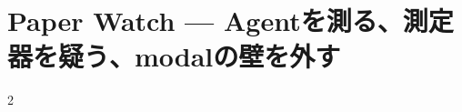\documentclass[lualatex,a4paper,11pt]{jlreq}
\begin{document}
\clearpage
\section{Paper Watch — Agentを測る、測定器を疑う、modalの壁を外す}
\label{pkg:paper-watch-may}
\vspace{0.15em}
\begin{multicols}{2}

\end{multicols}


\clearpage

\clearpage
\printbibliography[title={References / Source Notes}]
\end{document}
